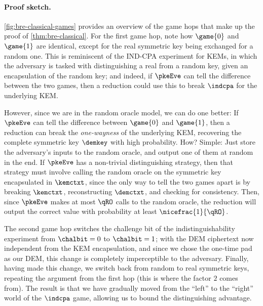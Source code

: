    \paragraph{Proof sketch.}
      \cref{fig:bre-classical-games} provides an overview of the game hops that
        make up the proof of \cref{thm:bre-classical}.
        For the first game hop, note how $\game{0}$ and $\game{1}$ are identical,
        except for the real symmetric key being exchanged for a random one. This
        is reminiscent of the IND-CPA experiment for KEMs, in which the
        adversary is tasked with distinguishing a real from a random key, given
        an encapsulation of the random key;
        and indeed, if $\pkeEve$ can tell the difference between the
        two games, then a reduction could use this to break $\indcpa$ for the
        underlying KEM.

      However, since we are in the random oracle model, we can do one better: If
        $\pkeEve$ can tell the difference between $\game{0}$ and $\game{1}$, then 
        a reduction can break the \emph{one-wayness} of the underlying KEM,
        recovering the complete symmetric key $\demkey$ with high probability. 
        How? Simple: Just store the adversary's inputs to the random oracle, and
        output one of them at random in the end.
        If $\pkeEve$ has a non-trivial distinguishing strategy, then that strategy must
        involve calling the random oracle on the symmetric key encapsulated in
        $\kemctxt$, since the only way to tell the two games apart is by breaking
        $\kemctxt$, reconstructing $\demctxt$, and checking for consistency.
        Then, since $\pkeEve$ makes at most $\qRO$ calls to the random oracle,
        the reduction will output the correct value with probability at least
        $\nicefrac{1}{\qRO}$.

      The second game hop switches the challenge bit of the indistinguishability
        experiment from $\chalbit=0$ to $\chalbit=1$; with the DEM ciphertext
        now independent from the KEM encapsulation, and since we chose the
        one-time pad as our DEM, this change is completely imperceptible
        to the adversary. Finally, having made this change, we switch back from
        random to real symmetric keys, repeating the argument from the first
        hop (this is where the factor $2$ comes from).
        The result is that we have gradually moved from the ``left'' to the ``right''
        world of the $\indcpa$ game, allowing us to bound the distinguishing advantage.

